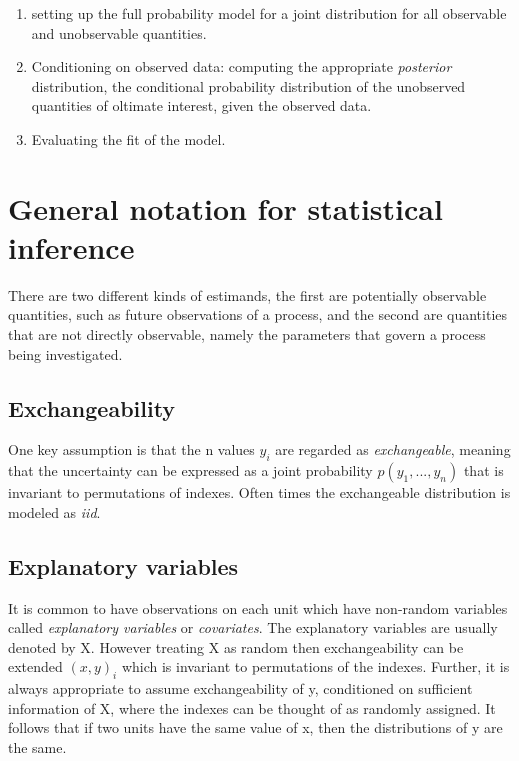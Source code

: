 \documentclass[
]{book}
\providecommand{\tightlist}{%
  \setlength{\itemsep}{0pt}\setlength{\parskip}{0pt}}
\theoremstyle{definition}
\theoremstyle{definition}
\theoremstyle{definition}
\theoremstyle{definition}
\theoremstyle{remark}
\begin{document}
\begin{enumerate}
\def\labelenumi{\arabic{enumi}.}
\tightlist
\item
  setting up the full probability model for a joint distribution for all observable and unobservable quantities.
\item
  Conditioning on observed data: computing the appropriate \emph{posterior} distribution, the conditional probability distribution of the unobserved quantities of oltimate interest, given the observed data.
\item
  Evaluating the fit of the model.
\end{enumerate}

\hypertarget{general-notation-for-statistical-inference}{%
\section{General notation for statistical inference}\label{general-notation-for-statistical-inference}}

There are two different kinds of estimands, the first are potentially observable quantities, such as future observations of a process, and the second are quantities that are not directly observable, namely the parameters that govern a process being investigated.

\hypertarget{exchangeability}{%
\subsection*{Exchangeability}\label{exchangeability}}

One key assumption is that the n values \(y_i\) are regarded as \emph{exchangeable}, meaning that the uncertainty can be expressed as a joint probability \(p(y_1,...,y_n)\) that is invariant to permutations of indexes. Often times the exchangeable distribution is modeled as \emph{iid}.

\hypertarget{explanatory-variables}{%
\subsection*{Explanatory variables}\label{explanatory-variables}}

It is common to have observations on each unit which have non-random variables called \emph{explanatory variables} or \emph{covariates}. The explanatory variables are usually denoted by X. However treating X as random then exchangeability can be extended \((x,y)_i\) which is invariant to permutations of the indexes. Further, it is always appropriate to assume exchangeability of y, conditioned on sufficient information of X, where the indexes can be thought of as randomly assigned. It follows that if two units have the same value of x, then the distributions of y are the same.
\end{document}
